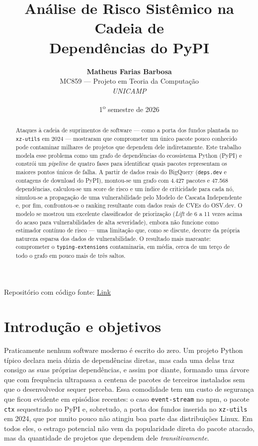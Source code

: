\documentclass[11pt,a4paper]{article}
\title{\vspace{-1.2cm}\textbf{Análise de Risco Sistêmico na Cadeia de\\
Dependências do PyPI}}
\author{\normalsize\textbf{Matheus Farias Barbosa}\\[2pt]
\small MC859 --- Projeto em Teoria da Computação\\
\small \textit{UNICAMP}}
\date{1\textsuperscript{o} semestre de 2026}
\begin{document}
\maketitle
\vspace{-0.7cm}

\begin{abstract}
\noindent
Ataques à cadeia de suprimentos de software --- como a porta dos fundos plantada
no \texttt{xz-utils} em 2024 --- mostraram que comprometer um único pacote pouco
conhecido pode contaminar milhares de projetos que dependem dele indiretamente.
Este trabalho modela esse problema como um grafo de dependências do ecossistema
Python (PyPI) e constrói um \emph{pipeline} de quatro fases para identificar quais
pacotes representam os maiores pontos únicos de falha. A partir de dados reais do
BigQuery (\texttt{deps.dev} e contagens de download do PyPI), montou-se um grafo
com 4.427 pacotes e 47.568 dependências, calculou-se um score de risco e um índice
de criticidade para cada nó, simulou-se a propagação de uma vulnerabilidade pelo
Modelo de Cascata Independente e, por fim, confrontou-se o ranking resultante com
dados reais de CVEs do OSV.dev. O modelo se mostrou um excelente classificador de
priorização (\emph{Lift} de 6 a 11 vezes acima do acaso para vulnerabilidades de
alta severidade), embora não funcione como estimador contínuo de risco --- uma
limitação que, como se discute, decorre da própria natureza esparsa dos dados de
vulnerabilidade. O resultado mais marcante: comprometer o \texttt{typing-extensions}
contaminaria, em média, cerca de um terço de todo o grafo em pouco mais de três
saltos.
\end{abstract}

Repositório com código fonte: \href{https://github.com/Leibniz23/MC859---Projeto}{Link}

\section{Introdução e objetivos}

Praticamente nenhum software moderno é escrito do zero. Um projeto Python típico
declara meia dúzia de dependências diretas, mas cada uma delas traz consigo as suas
próprias dependências, e assim por diante, formando uma árvore que com frequência
ultrapassa a centena de pacotes de terceiros instalados sem que o desenvolvedor
sequer perceba. Essa comodidade tem um custo de segurança que ficou evidente em
episódios recentes: o caso \texttt{event-stream} no npm, o pacote \texttt{ctx}
sequestrado no PyPI e, sobretudo, a porta dos fundos inserida no \texttt{xz-utils}
em 2024, que por muito pouco não atingiu boa parte das distribuições Linux. Em todos
eles, o estrago potencial não vem da popularidade direta do pacote atacado, mas da
quantidade de projetos que dependem dele \emph{transitivamente}.
\end{document}
